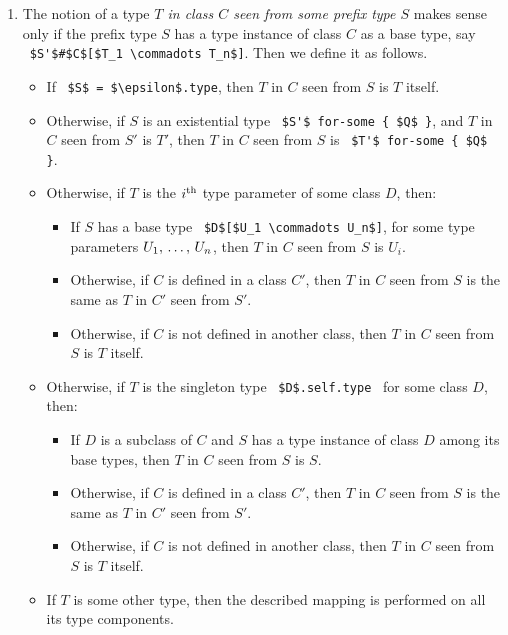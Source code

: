 \begin{enumerate}
\item
The notion of a type {\em $T$ in class $C$ seen from some prefix type $S$} makes sense only if the prefix type $S$ has a type instance of class $C$ as a base type, say ~\lstinline!$S'$#$C$[$T_1 \commadots T_n$]!. Then we define it as follows.
\begin{itemize}
\item If ~\lstinline!$S$ = $\epsilon$.type!, then $T$ in $C$ seen from $S$ is $T$ itself. 

\item Otherwise, if $S$ is an existential type ~\lstinline!$S'$ for-some { $Q$ }!, and $T$ in $C$ seen from $S'$ is $T'$, then $T$ in $C$ seen from $S$ is ~\lstinline!$T'$ for-some { $Q$ }!. 

\item Otherwise, if $T$ is the $i^{\mbox{\scriptsize th}}$ type parameter of some class $D$, then:
\begin{itemize}
\item If $S$ has a base type ~\lstinline!$D$[$U_1 \commadots U_n$]!, for some type parameters $U_1 ,\, \ldots ,\, U_n$, then $T$ in $C$ seen from $S$ is $U_i$. 
\item Otherwise, if $C$ is defined in a class $C'$, then $T$ in $C$ seen from $S$ is the same as $T$ in $C'$ seen from $S'$. 
\item Otherwise, if $C$ is not defined in another class, then $T$ in $C$ seen from $S$ is $T$ itself. 
\end{itemize}

\item Otherwise, if $T$ is the singleton type ~\lstinline!$D$.self.type!~ for some class $D$, then:
\begin{itemize}
\item If $D$ is a subclass of $C$ and $S$ has a type instance of class $D$ among its base types, then $T$ in $C$ seen from $S$ is $S$. 
\item Otherwise, if $C$ is defined in a class $C'$, then $T$ in $C$ seen from $S$ is the same as $T$ in $C'$ seen from $S'$. 
\item Otherwise, if $C$ is not defined in another class, then $T$ in $C$ seen from $S$ is $T$ itself. 
\end{itemize}

\item
If $T$ is some other type, then the described mapping is performed on all its type components. 

\end{itemize}


\end{enumerate}
